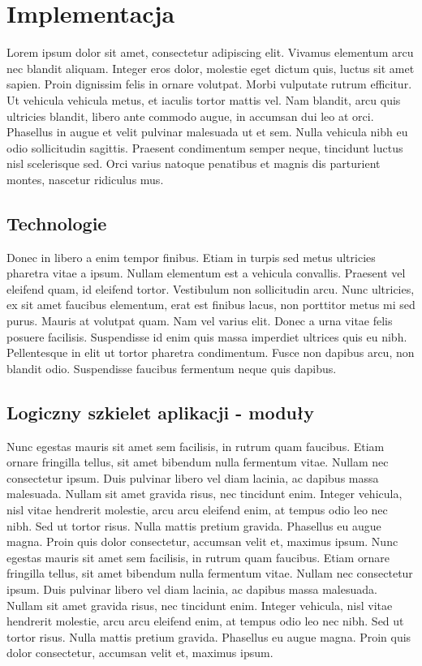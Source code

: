\chapter{Implementacja}
Lorem ipsum dolor sit amet, consectetur adipiscing elit. Vivamus elementum arcu nec blandit aliquam. Integer eros dolor, molestie eget dictum quis, luctus sit amet sapien. Proin dignissim felis in ornare volutpat. Morbi vulputate rutrum efficitur. Ut vehicula vehicula metus, et iaculis tortor mattis vel. Nam blandit, arcu quis ultricies blandit, libero ante commodo augue, in accumsan dui leo at orci. Phasellus in augue et velit pulvinar malesuada ut et sem. Nulla vehicula nibh eu odio sollicitudin sagittis. Praesent condimentum semper neque, tincidunt luctus nisl scelerisque sed. Orci varius natoque penatibus et magnis dis parturient montes, nascetur ridiculus mus.

\section{Technologie}
Donec in libero a enim tempor finibus. Etiam in turpis sed metus ultricies pharetra vitae a ipsum. Nullam elementum est a vehicula convallis. Praesent vel eleifend quam, id eleifend tortor. Vestibulum non sollicitudin arcu. Nunc ultricies, ex sit amet faucibus elementum, erat est finibus lacus, non porttitor metus mi sed purus. Mauris at volutpat quam. Nam vel varius elit. Donec a urna vitae felis posuere facilisis. Suspendisse id enim quis massa imperdiet ultrices quis eu nibh. Pellentesque in elit ut tortor pharetra condimentum. Fusce non dapibus arcu, non blandit odio. Suspendisse faucibus fermentum neque quis dapibus.

\section{Logiczny szkielet aplikacji - moduły}
Nunc egestas mauris sit amet sem facilisis, in rutrum quam faucibus. Etiam ornare fringilla tellus, sit amet bibendum nulla fermentum vitae. Nullam nec consectetur ipsum. Duis pulvinar libero vel diam lacinia, ac dapibus massa malesuada. Nullam sit amet gravida risus, nec tincidunt enim. Integer vehicula, nisl vitae hendrerit molestie, arcu arcu eleifend enim, at tempus odio leo nec nibh. Sed ut tortor risus. Nulla mattis pretium gravida. Phasellus eu augue magna. Proin quis dolor consectetur, accumsan velit et, maximus ipsum. 
Nunc egestas mauris sit amet sem facilisis, in rutrum quam faucibus. Etiam ornare fringilla tellus, sit amet bibendum nulla fermentum vitae. Nullam nec consectetur ipsum. Duis pulvinar libero vel diam lacinia, ac dapibus massa malesuada. Nullam sit amet gravida risus, nec tincidunt enim. Integer vehicula, nisl vitae hendrerit molestie, arcu arcu eleifend enim, at tempus odio leo nec nibh. Sed ut tortor risus. Nulla mattis pretium gravida. Phasellus eu augue magna. Proin quis dolor consectetur, accumsan velit et, maximus ipsum. 

